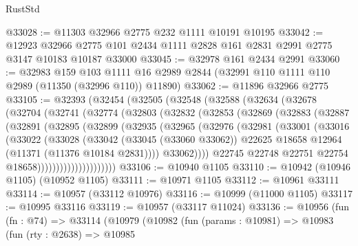 \begin{lexlean}{RustStd}
\begin{coremodule}
@33028 := @11303 @32966 @2775 @232 @1111 @10191 @10195
@33042 := @12923
    @32966
    @2775
    @101
    @2434
    @1111
    @2828
    @161
    @2831
    @2991
    @2775
    @3147
    @10183
    @10187
    @33000
@33045 := @32978 @161 @2434 @2991
@33060 := @32983
    @159
    @103
    @1111
    @16
    @2989
    @2844
    (@32991 @110 @1111 @110 @2989 (@11350 (@32996 @110)) @11890)
@33062 := @11896 @32966 @2775
@33105 := @32393
    (@32454
      (@32505
        (@32548
          (@32588
            (@32634
              (@32678
                (@32704
                  (@32741
                    (@32774
                      (@32803
                        (@32832
                          (@32853
                            (@32869
                              (@32883
                                (@32887
                                  (@32891
                                    (@32895
                                      (@32899
                                        (@32935
                                          (@32965
                                            (@32976
                                              (@32981
                                                (@33001
                                                  (@33016
                                                    (@33022
                                                      (@33028
                                                        (@33042
                                                          (@33045 (@33060 @33062))
                                                          @22625
                                                          @18658
                                                          @12964
                                                          (@11371 (@11376 @10184 @2831))))
                                                      @33062))))
                                              @22745
                                              @22748
                                              @22751
                                              @22754
                                              @18658)))))))))))))))))))))
@33106 := @10940 @1105
@33110 := @10942 (@10946 @1105) (@10952 @1105)
@33111 := @10971 @1105
@33112 := @10961 @33111
@33114 := @10957 (@33112 @10976)
@33116 := @10999 (@11000 @1105)
@33117 := @10995 @33116
@33119 := @10957 (@33117 @11024)
@33136 := @10956
    (fun (fn : @74) =>
    @33114
      (@10979
        (@10982
          (fun (params : @10981) =>
          @10983
            (fun (rty : @2638) =>
            @10985

\end{coremodule}
\end{lexlean}
